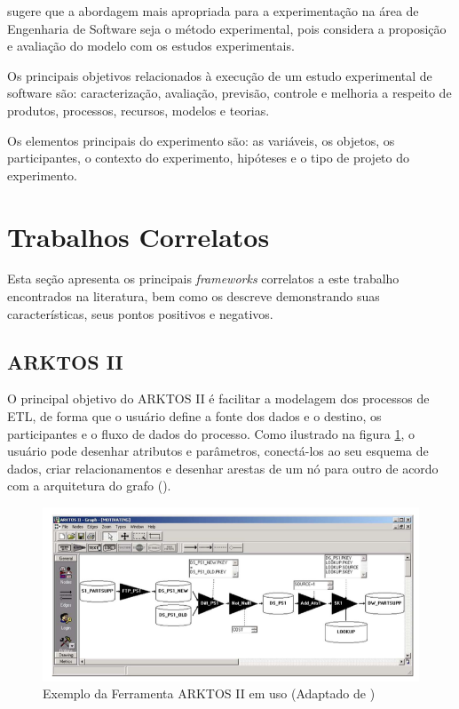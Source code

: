 \cite{travassos:2002} sugere que a abordagem mais apropriada para a experimentação na área de Engenharia de Software seja o método experimental, pois considera a proposição e avaliação do modelo com os estudos experimentais.

Os principais objetivos relacionados à execução de um estudo experimental de software são: caracterização, avaliação, previsão, controle e melhoria a respeito de produtos, processos, recursos, modelos e teorias.

Os elementos principais do experimento são: as variáveis, os objetos, os participantes, o contexto do experimento, hipóteses e o tipo de projeto do experimento.

\section{Trabalhos Correlatos}

\noindent Esta seção apresenta os principais \textit{frameworks} correlatos a este trabalho encontrados na literatura, bem como os descreve  demonstrando suas características, seus pontos positivos e negativos.



\subsection{ARKTOS II}

O principal objetivo do ARKTOS II é facilitar a modelagem dos processos de ETL, de forma que o usuário define a fonte dos dados e o destino, os participantes e o fluxo de dados do processo. Como ilustrado na figura \ref{arktosii}, o usuário pode desenhar atributos e parâmetros, conectá-los ao seu esquema de dados, criar relacionamentos e desenhar arestas de um nó para outro de acordo com a arquitetura do grafo (\cite{vassiliadis:2005}).


\begin{figure}[h]
	\centering
	\includegraphics[scale=0.5]{fig/arktosii.png}
	\caption{Exemplo da Ferramenta ARKTOS II em uso (Adaptado de \cite{vassiliadis:2005})}
	\label{arktosii}
\end{figure}

